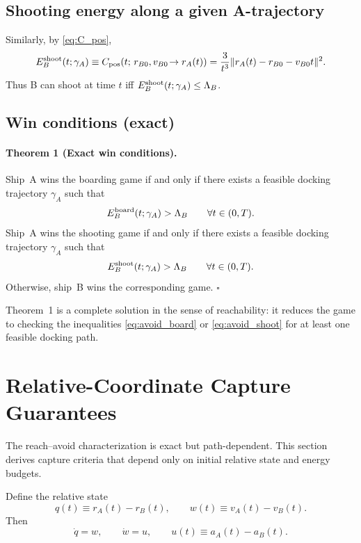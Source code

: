 \documentclass[journal, a4paper]{IEEEtran}
\begin{document}
\subsection{Shooting energy along a given A-trajectory}
Similarly, by \eqref{eq:C_pos},
\begin{equation}
E_B^{\rm shoot}(t;\gamma_A)
\equiv
C_{\rm pos}\!\left(t;\,r_{B0},v_{B0}\!\to r_A(t)\right)
=
\frac{3}{t^3}\|r_A(t)-r_{B0}-v_{B0}t\|^2.
\label{eq:EShoot}
\end{equation}
Thus B can shoot at time $t$ iff $E_B^{\rm shoot}(t;\gamma_A)\le\Lambda_B$.

\subsection{Win conditions (exact)}
\paragraph{Theorem 1 (Exact win conditions).}
Ship~A wins the boarding game if and only if there exists a feasible docking trajectory $\gamma_A$ such that
\begin{equation}
E_B^{\rm board}(t;\gamma_A)>\Lambda_B
\qquad\forall t\in(0,T).
\label{eq:avoid_board}
\end{equation}
Ship~A wins the shooting game if and only if there exists a feasible docking trajectory $\gamma_A$ such that
\begin{equation}
E_B^{\rm shoot}(t;\gamma_A)>\Lambda_B
\qquad\forall t\in(0,T).
\label{eq:avoid_shoot}
\end{equation}
Otherwise, ship~B wins the corresponding game.
\hfill$\square$

Theorem~1 is a complete solution in the sense of reachability: it reduces the game to checking the inequalities \eqref{eq:avoid_board} or \eqref{eq:avoid_shoot} for at least one feasible docking path.

\section{Relative-Coordinate Capture Guarantees}
\label{sec:relative}

The reach--avoid characterization is exact but path-dependent.
This section derives capture criteria that depend only on initial relative state and energy budgets.

Define the relative state
\begin{equation}
q(t)\equiv r_A(t)-r_B(t),\qquad w(t)\equiv v_A(t)-v_B(t).
\end{equation}
Then
\begin{equation}
\dot q = w,\qquad \dot w = u,
\qquad u(t)\equiv a_A(t)-a_B(t).
\label{eq:relative_dyn}
\end{equation}
\end{document}

